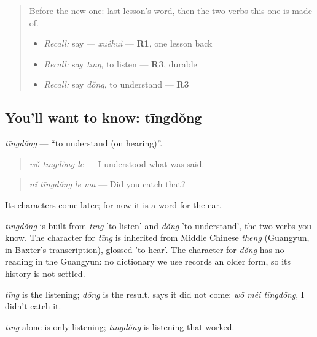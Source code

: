 \label{lesson:ZH-C151-tingdong}



\begin{quote}
Before the new one: last lesson's word, then the two verbs this one is made of.

\begin{itemize}
\raggedright
  \item \emph{Recall:} say  — \emph{xuéhuì} — \textbf{R1}, one lesson back
  \item \emph{Recall:} say \emph{tīng}, to listen — \textbf{R3}, durable
  \item \emph{Recall:} say \emph{dǒng}, to understand — \textbf{R3}
\end{itemize}
\end{quote}

\subsection*{You'll want to know: tīngdǒng}
\emph{tīngdǒng} — \textquotedblleft{}to understand (on hearing)\textquotedblright{}.

\begin{quote}
\emph{wǒ tīngdǒng le} — I understood what was said.
\end{quote}

\begin{quote}
\emph{nǐ tīngdǒng le ma} — Did you catch that?
\end{quote}

Its characters come later; for now it is a word for the ear.

\begin{cousinweb}
\emph{tīngdǒng} is built from \emph{tīng} 'to listen' and \emph{dǒng} 'to understand', the two verbs you know. The character for \emph{tīng} is inherited from Middle Chinese \emph{theng} (Guangyun, in Baxter's transcription), glossed 'to hear'. The character for \emph{dǒng} has no reading in the Guangyun: no dictionary we use records an older form, so its history is not settled.
\end{cousinweb}

\begin{grammarlens}[title={What you've built}]
\emph{tīng} is the listening; \emph{dǒng} is the result.  says it did not come: \emph{wǒ méi tīngdǒng}, I didn't catch it.

\emph{tīng} alone is only listening; \emph{tīngdǒng} is listening that worked.
\end{grammarlens}

